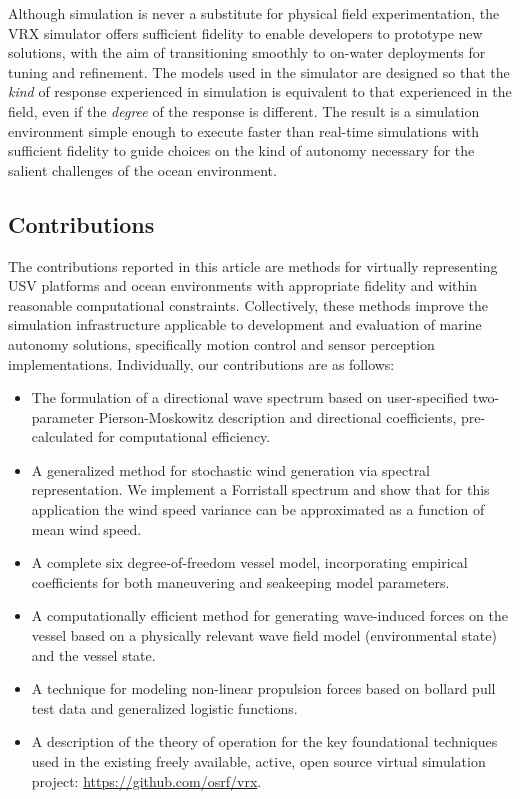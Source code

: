 \documentclass[utf8]{frontiersSCNS} %
\begin{document}
Although simulation is never a substitute for physical field experimentation, the VRX simulator offers sufficient fidelity to enable developers to prototype new solutions, with the aim of transitioning smoothly to on-water deployments for tuning and refinement.  The models used in the simulator are designed so that the \emph{kind} of response experienced in simulation is equivalent to that experienced in the field, even if the \emph{degree} of the response is different.  The result is a simulation environment simple enough to execute faster than real-time simulations with sufficient fidelity to guide choices on the kind of autonomy necessary for the salient challenges of the ocean environment.


\subsection{Contributions}
The contributions reported in this article are methods for virtually representing USV platforms and ocean environments with appropriate fidelity and within reasonable computational constraints. Collectively, these methods improve the simulation infrastructure applicable to development and evaluation of marine autonomy solutions, specifically motion control and sensor perception implementations.  Individually, our contributions are as follows: 
\begin{itemize}
\item The formulation of a directional wave spectrum based on user-specified two-parameter Pierson-Moskowitz description and directional coefficients, pre-calculated for computational efficiency.
\item A generalized method for stochastic wind generation via spectral representation. We implement a Forristall spectrum and show that for this application the wind speed variance can be approximated as a function of mean wind speed.
\item A complete six degree-of-freedom vessel model, incorporating empirical coefficients for both maneuvering and seakeeping model parameters.
\item A computationally efficient method for generating wave-induced forces on the vessel based on a physically relevant wave field model (environmental state) and the vessel state.
 \item A technique for modeling non-linear propulsion forces based on bollard pull test data and generalized logistic functions.
\item A description of the theory of operation for the key foundational techniques used in the existing freely available, active, open source virtual simulation project: \url{https://github.com/osrf/vrx}.
\end{itemize}
\end{document}
